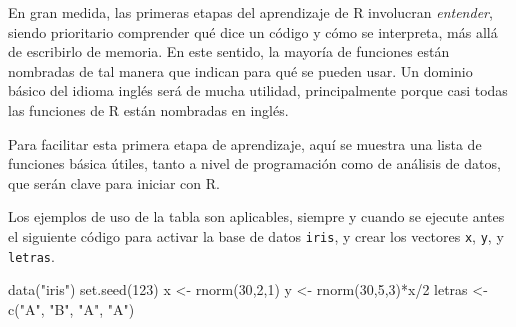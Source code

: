 \documentclass[
]{article}
\newenvironment{Shaded}{\begin{snugshade}}{\end{snugshade}}
\newcommand{\DecValTok}[1]{\textcolor[rgb]{0.00,0.00,0.81}{#1}}
\newcommand{\FunctionTok}[1]{\textcolor[rgb]{0.00,0.00,0.00}{#1}}
\newcommand{\NormalTok}[1]{#1}
\newcommand{\OtherTok}[1]{\textcolor[rgb]{0.56,0.35,0.01}{#1}}
\newcommand{\SpecialCharTok}[1]{\textcolor[rgb]{0.00,0.00,0.00}{#1}}
\newcommand{\StringTok}[1]{\textcolor[rgb]{0.31,0.60,0.02}{#1}}
\theoremstyle{definition}
\theoremstyle{definition}
\theoremstyle{definition}
\theoremstyle{definition}
\theoremstyle{remark}
\begin{document}
En gran medida, las primeras etapas del aprendizaje de R involucran \emph{entender}, siendo prioritario comprender qué dice un código y cómo se interpreta, más allá de escribirlo de memoria. En este sentido, la mayoría de funciones están nombradas de tal manera que indican para qué se pueden usar. Un dominio básico del idioma inglés será de mucha utilidad, principalmente porque casi todas las funciones de R están nombradas en inglés.

Para facilitar esta primera etapa de aprendizaje, aquí se muestra una lista de funciones básica útiles, tanto a nivel de programación como de análisis de datos, que serán clave para iniciar con R.

Los ejemplos de uso de la tabla son aplicables, siempre y cuando se ejecute antes el siguiente código para activar la base de datos \texttt{iris}, y crear los vectores \texttt{x}, \texttt{y}, y \texttt{letras}.

\begin{Shaded}
\begin{Highlighting}[]
\FunctionTok{data}\NormalTok{(}\StringTok{"iris"}\NormalTok{)}
\FunctionTok{set.seed}\NormalTok{(}\DecValTok{123}\NormalTok{)}
\NormalTok{x }\OtherTok{\textless{}{-}} \FunctionTok{rnorm}\NormalTok{(}\DecValTok{30}\NormalTok{,}\DecValTok{2}\NormalTok{,}\DecValTok{1}\NormalTok{)}
\NormalTok{y }\OtherTok{\textless{}{-}} \FunctionTok{rnorm}\NormalTok{(}\DecValTok{30}\NormalTok{,}\DecValTok{5}\NormalTok{,}\DecValTok{3}\NormalTok{)}\SpecialCharTok{*}\NormalTok{x}\SpecialCharTok{/}\DecValTok{2}
\NormalTok{letras }\OtherTok{\textless{}{-}} \FunctionTok{c}\NormalTok{(}\StringTok{"A"}\NormalTok{, }\StringTok{"B"}\NormalTok{, }\StringTok{"A"}\NormalTok{, }\StringTok{"A"}\NormalTok{)}
\end{Highlighting}
\end{Shaded}
\end{document}
